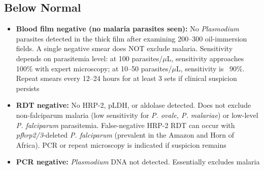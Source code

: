 \subsection*{Below Normal}
\begin{itemize}
  \item \textbf{Blood film negative (no malaria parasites seen):} No \textit{Plasmodium} parasites detected in the thick film after examining 200--300 oil-immersion fields. A single negative smear does NOT exclude malaria. Sensitivity depends on parasitemia level: at 100 parasites/$\mu$L, sensitivity approaches 100\% with expert microscopy; at 10--50 parasites/$\mu$L, sensitivity is ~90\%. Repeat smears every 12--24 hours for at least 3 sets if clinical suspicion persists
  \item \textbf{RDT negative:} No HRP-2, pLDH, or aldolase detected. Does not exclude non-falciparum malaria (low sensitivity for \textit{P. ovale, P. malariae}) or low-level \textit{P. falciparum} parasitemia. False-negative HRP-2 RDT can occur with \textit{pfhrp2/3}-deleted \textit{P. falciparum} (prevalent in the Amazon and Horn of Africa). PCR or repeat microscopy is indicated if suspicion remains
  \item \textbf{PCR negative:} \textit{Plasmodium} DNA not detected. Essentially excludes malaria
\end{itemize}

